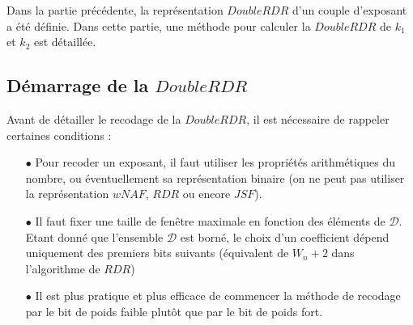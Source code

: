 \documentclass[12pt, a4paper]{memoir}
\begin{document}
Dans la partie précédente, la représentation $DoubleRDR$ d'un couple d'exposant a été définie.
Dans cette partie, une méthode pour calculer la $DoubleRDR$ de $k_1$ et $k_2$ est détaillée.

  \subsection{Démarrage de la $DoubleRDR$}
  
  Avant de détailler le recodage de la $DoubleRDR$, il est nécessaire de rappeler certaines conditions :
  \begin{itemize}
   \item [$\bullet$] Pour recoder un exposant, il faut utiliser les propriétés arithmétiques du nombre, ou éventuellement
   sa représentation binaire (on ne peut pas utiliser la représentation $wNAF$, $RDR$ ou encore $JSF$).
   \item [$\bullet$] Il faut fixer une taille de fenêtre maximale en fonction des éléments de $\mathcal{D}$.
   Etant donné que l'ensemble $\mathcal{D}$ est borné, le choix d'un coefficient dépend uniquement des premiers 
   bits suivants (équivalent de $W_n + 2$ dans l'algorithme de $RDR$)
   \item [$\bullet$] Il est plus pratique et plus efficace de commencer la méthode de recodage par le bit de 
   poids faible plutôt que par le bit de poids fort.
  \end{itemize}

   
   
    
\end{document}
